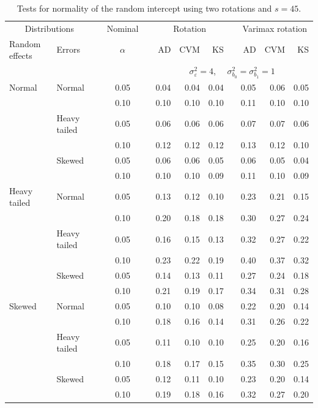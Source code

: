 \documentclass[12pt]{article} %
\begin{document}
\begin{table}[ht]
\caption{Tests for normality of the random intercept using two rotations and $s = 45$.}
\begin{scriptsize}
\begin{center}
\begin{tabular}{ll p{.1cm} c p{.1cm} rrr p{.1cm} rrr}
  \hline
  \multicolumn{2}{c}{Distributions}& & Nominal & &  \multicolumn{3}{c}{Rotation} & & \multicolumn{3}{c}{Varimax rotation} \\ \cline{1-2} \cline{6-8} \cline{10-12}   
  Random effects & Errors & & $\alpha$ & & AD & CVM & KS & & AD & CVM & KS \\ 
   \hline
& && && \multicolumn{7}{c}{$\sigma_{\varepsilon}^2 = 4$, \ \ $\sigma_{b_0}^2 = \sigma_{b_1}^2 = 1$} \\ \cline{6-12}
Normal       & Normal       && 0.05 &&   0.04 & 0.04 & 0.04 && 0.05 & 0.06 & 0.05 \\ 
             &              && 0.10 &&   0.10 & 0.10 & 0.10 && 0.11 & 0.10 & 0.10 \\ 
             & Heavy tailed && 0.05 &&   0.06 & 0.06 & 0.06 && 0.07 & 0.07 & 0.06 \\ 
             &              && 0.10 &&   0.12 & 0.12 & 0.12 && 0.13 & 0.12 & 0.10 \\ 
             & Skewed       && 0.05 &&   0.06 & 0.06 & 0.05 && 0.06 & 0.05 & 0.04 \\ 
             &              && 0.10 &&   0.10 & 0.10 & 0.09 && 0.11 & 0.10 & 0.09 \\ 
Heavy tailed & Normal       && 0.05 &&   0.13 & 0.12 & 0.10 && 0.23 & 0.21 & 0.15 \\ 
             &              && 0.10 &&   0.20 & 0.18 & 0.18 && 0.30 & 0.27 & 0.24 \\ 
             & Heavy tailed && 0.05 &&   0.16 & 0.15 & 0.13 && 0.32 & 0.27 & 0.22 \\ 
             &              && 0.10 &&   0.23 & 0.22 & 0.19 && 0.40 & 0.37 & 0.32 \\ 
             & Skewed       && 0.05 &&   0.14 & 0.13 & 0.11 && 0.27 & 0.24 & 0.18 \\ 
             &              && 0.10 &&   0.21 & 0.19 & 0.17 && 0.34 & 0.31 & 0.28 \\ 
Skewed       & Normal       && 0.05 &&   0.10 & 0.10 & 0.08 && 0.22 & 0.20 & 0.14 \\ 
             &              && 0.10 &&   0.18 & 0.16 & 0.14 && 0.31 & 0.26 & 0.22 \\ 
             & Heavy tailed && 0.05 &&   0.11 & 0.10 & 0.10 && 0.25 & 0.20 & 0.16 \\ 
             &              && 0.10 &&   0.18 & 0.17 & 0.15 && 0.35 & 0.30 & 0.25 \\ 
             & Skewed       && 0.05 &&   0.12 & 0.11 & 0.10 && 0.23 & 0.20 & 0.14 \\ 
             &              && 0.10 &&   0.19 & 0.18 & 0.16 && 0.32 & 0.27 & 0.20 \\ 


\end{tabular}
\end{center}
\end{scriptsize}
\end{table}
\end{document}
